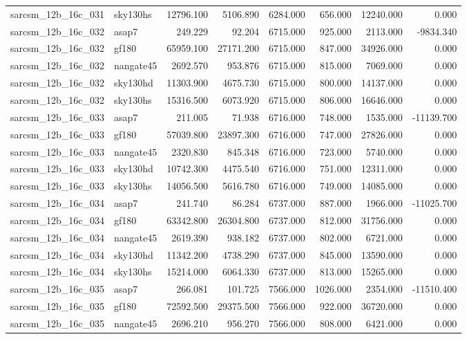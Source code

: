 \begin{tabular}{llrrrrrr}
sarcsm\_12b\_16c\_031 & sky130hs & 12796.100 & 5106.890 & 6284.000 & 656.000 & 12240.000 & 0.000 \\
sarcsm\_12b\_16c\_032 & asap7 & 249.229 & 92.204 & 6715.000 & 925.000 & 2113.000 & -9834.340 \\
sarcsm\_12b\_16c\_032 & gf180 & 65959.100 & 27171.200 & 6715.000 & 847.000 & 34926.000 & 0.000 \\
sarcsm\_12b\_16c\_032 & nangate45 & 2692.570 & 953.876 & 6715.000 & 815.000 & 7069.000 & 0.000 \\
sarcsm\_12b\_16c\_032 & sky130hd & 11303.900 & 4675.730 & 6715.000 & 800.000 & 14137.000 & 0.000 \\
sarcsm\_12b\_16c\_032 & sky130hs & 15316.500 & 6073.920 & 6715.000 & 806.000 & 16646.000 & 0.000 \\
sarcsm\_12b\_16c\_033 & asap7 & 211.005 & 71.938 & 6716.000 & 748.000 & 1535.000 & -11139.700 \\
sarcsm\_12b\_16c\_033 & gf180 & 57039.800 & 23897.300 & 6716.000 & 747.000 & 27826.000 & 0.000 \\
sarcsm\_12b\_16c\_033 & nangate45 & 2320.830 & 845.348 & 6716.000 & 723.000 & 5740.000 & 0.000 \\
sarcsm\_12b\_16c\_033 & sky130hd & 10742.300 & 4475.540 & 6716.000 & 751.000 & 12311.000 & 0.000 \\
sarcsm\_12b\_16c\_033 & sky130hs & 14056.500 & 5616.780 & 6716.000 & 749.000 & 14085.000 & 0.000 \\
sarcsm\_12b\_16c\_034 & asap7 & 241.740 & 86.284 & 6737.000 & 887.000 & 1966.000 & -11025.700 \\
sarcsm\_12b\_16c\_034 & gf180 & 63342.800 & 26304.800 & 6737.000 & 812.000 & 31756.000 & 0.000 \\
sarcsm\_12b\_16c\_034 & nangate45 & 2619.390 & 938.182 & 6737.000 & 802.000 & 6721.000 & 0.000 \\
sarcsm\_12b\_16c\_034 & sky130hd & 11342.200 & 4738.290 & 6737.000 & 845.000 & 13590.000 & 0.000 \\
sarcsm\_12b\_16c\_034 & sky130hs & 15214.000 & 6064.330 & 6737.000 & 813.000 & 15265.000 & 0.000 \\
sarcsm\_12b\_16c\_035 & asap7 & 266.081 & 101.725 & 7566.000 & 1026.000 & 2354.000 & -11510.400 \\
sarcsm\_12b\_16c\_035 & gf180 & 72592.500 & 29375.500 & 7566.000 & 922.000 & 36720.000 & 0.000 \\
sarcsm\_12b\_16c\_035 & nangate45 & 2696.210 & 956.270 & 7566.000 & 808.000 & 6421.000 & 0.000 \\

\end{tabular}
